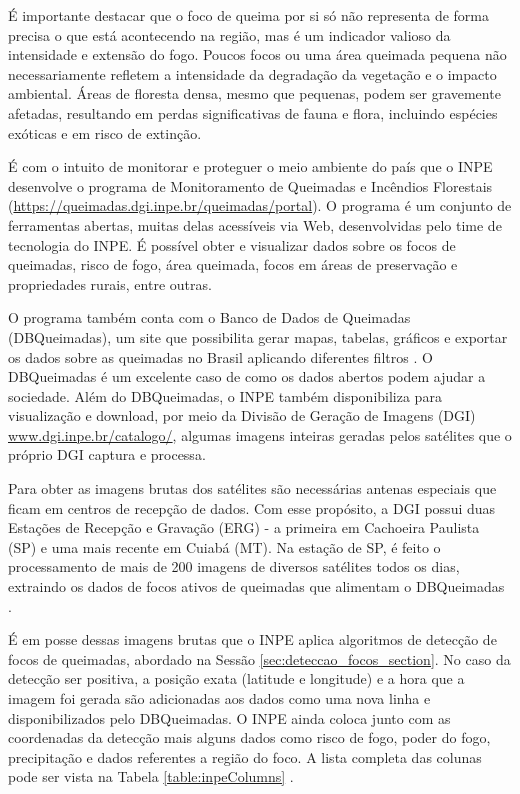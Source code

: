 \documentclass[cic,tc]{iiufrgs}
\begin{document}
É importante destacar que o foco de queima por si só não representa de forma precisa o que está acontecendo na região, mas é um indicador valioso da intensidade e extensão do fogo. Poucos focos ou uma área queimada pequena não necessariamente refletem a intensidade da degradação da vegetação e o impacto ambiental. Áreas de floresta densa, mesmo que pequenas, podem ser gravemente afetadas, resultando em perdas significativas de fauna e flora, incluindo espécies exóticas e em risco de extinção. \par

É com o intuito de monitorar e proteguer o meio ambiente do país que o INPE desenvolve o programa de Monitoramento de Queimadas e Incêndios Florestais (\url{https://queimadas.dgi.inpe.br/queimadas/portal}). O programa é um conjunto de ferramentas abertas, muitas delas acessíveis via Web, desenvolvidas pelo time de tecnologia do INPE. É possível obter e visualizar dados sobre os focos de queimadas, risco de fogo, área queimada, focos em áreas de preservação e propriedades rurais, entre outras. \par

O programa também conta com o Banco de Dados de Queimadas (DBQueimadas), um site que possibilita gerar mapas, tabelas, gráficos e exportar os dados sobre as queimadas no Brasil aplicando diferentes filtros \citep{setzer2019banco}. O DBQueimadas é um excelente caso de como os dados abertos podem ajudar a sociedade. Além do DBQueimadas, o INPE também disponibiliza para visualização e download, por meio da Divisão de Geração de Imagens (DGI) \url{www.dgi.inpe.br/catalogo/}, algumas imagens inteiras geradas pelos satélites que o próprio DGI captura e processa. \par

Para obter as imagens brutas dos satélites são necessárias antenas especiais que ficam em centros de recepção de dados. Com esse propósito, a DGI possui duas Estações de Recepção e Gravação (ERG) - a primeira em Cachoeira Paulista (SP) e uma mais recente em Cuiabá (MT). Na estação de SP, é feito o processamento de mais de 200 imagens de diversos satélites todos os dias, extraindo os dados de focos ativos de queimadas que alimentam o DBQueimadas \citep{SiteDGI}. \par

É em posse dessas imagens brutas que o INPE aplica algoritmos de detecção de focos de queimadas, abordado na Sessão \ref{sec:deteccao_focos_section}. No caso da detecção ser positiva, a posição exata (latitude e longitude) e a hora que a imagem foi gerada são adicionadas aos dados como uma nova linha e disponibilizados pelo DBQueimadas. O INPE ainda coloca junto com as coordenadas da detecção mais alguns dados como risco de fogo, poder do fogo, precipitação e dados referentes a região do foco. A lista completa das colunas pode ser vista na Tabela \ref{table:inpeColumns} \cite{PerguntasFrequentesINPE}. \par
\end{document}
